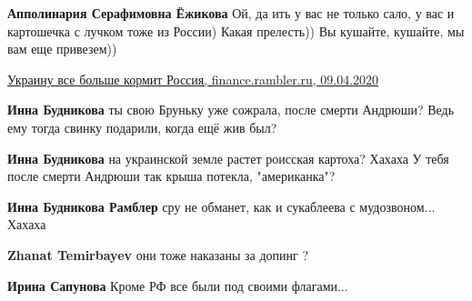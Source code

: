 \begin{itemize}
\begin{itemize}
\textbf{Апполинария Серафимовна Ёжикова} Ой, да ить у вас не только сало, у вас и картошечка с лучком тоже из России) Какая прелесть)) Вы кушайте, кушайте, мы вам еще привезем))

\href{https://finance.rambler.ru/economics/43991250-ukrainu-vse-bolshe-kormit-rossiya/}{%
Украину все больше кормит Россия, finance.rambler.ru, 09.04.2020%
}

 
\textbf{Инна Будникова} ты свою Бруньку уже сожрала, после смерти Андрюши? Ведь ему тогда свинку подарили, когда ещё жив был?

 
\textbf{Инна Будникова} на украинской земле растет роисская картоха? Хахаха У тебя после смерти Андрюши так крыша потекла, "американка"? 🤣😂🤣

 
\textbf{Инна Будникова Рамблер} сру не обманет, как и сукаблеева с мудозвоном... Хахаха

 
\textbf{Zhanat Temirbayev} они тоже наказаны за допинг ?

 
\textbf{Ирина Сапунова} Кроме РФ все были под своими флагами...


\end{itemize}
\end{itemize}
